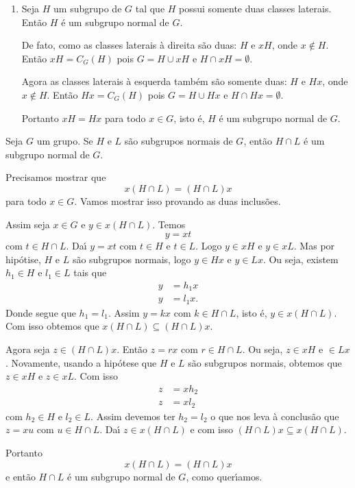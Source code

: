 \begin{exemplos}
\begin{enumerate}[label={\arabic*})]
        \item Seja $H$ um subgrupo de $G$ tal que $H$ possui somente duas classes laterais. Ent\~ao $H$ \'e um subgrupo normal de $G$.
        \begin{solucao}
            De fato, como as classes laterais \`a direita s\~ao duas: $H$ e $xH$, onde $x \notin H$. Ent\~ao $xH = C_G(H)$ pois $G = H \cup xH$ e $H \cap xH = \emptyset$.

            Agora as classes laterais \`a esquerda tamb\'em s\~ao somente duas: $H$ e $Hx$, onde $x \notin H$. Ent\~ao $Hx = C_G(H)$ pois $G = H \cup Hx$ e $H \cap Hx = \emptyset$.

            Portanto $xH = Hx$ para todo $x \in G$, isto \'e, $H$ \'e um subgrupo normal de $G$.
        \end{solucao}
    \end{enumerate}
\end{exemplos}

\begin{proposicao}
    Seja $G$ um grupo. Se $H$ e $L$ s\~ao subgrupos normais de $G$, ent\~ao $H \cap L$ \'e um subgrupo normal de $G$.
\end{proposicao}
\begin{prova}
    Precisamos mostrar que
    \[
        x(H\cap L) = (H \cap L)x
    \]
    para todo $x \in G$. Vamos mostrar isso provando as duas inclus\~oes.

    Assim seja $x \in G$ e $y \in x(H\cap L)$. Temos
    \[
        y = xt
    \]
    com $t \in H\cap L$. Da{\'\i} $y = xt$ com $t \in H$ e $t \in L$. Logo $y \in xH$ e $y \in xL$. Mas por hip\'otise, $H$ e $L$ s\~ao subgrupos normais, logo $y \in Hx$ e $y \in Lx$. Ou seja, existem $h_1 \in H$ e $l_1 \in L$ tais que
    \begin{align*}
        y &= h_1x\\
        y &= l_1x.
    \end{align*}
    Donde segue que $h_1 = l_1$. Assim $y = kx$ com $k \in H\cap L$, isto \'e, $y \in x(H\cap L)$. Com isso obtemos que $x(H\cap L) \subseteq (H\cap L)x$.

    Agora seja $z \in (H\cap L)x$. Ent\~ao $z = rx$ com $r \in H\cap L$. Ou seja, $z \in xH$ e $ \in Lx$. Novamente, usando a hip\'otese que $H$ e $L$ s\~ao subgrupos normais, obtemos que $z \in xH$ e $z \in xL$. Com isso
    \begin{align*}
        z &= xh_2\\
        z &= xl_2
    \end{align*}
    com $h_2 \in H$ e $l_2 \in L$. Assim devemos ter $h_2 = l_2$ o que nos leva \`a conclus\~ao que $z = xu$ com $u \in H\cap L$. Da{\'\i} $z \in x(H \cap L)$ e com isso $(H \cap L)x \subseteq x(H \cap L)$.

    Portanto
    \[
        x(H \cap L) = (H \cap L)x
    \]
    e ent\~ao $H \cap L$ \'e um subgrupo normal de $G$, como quer{\'\i}amos.
\end{prova}


